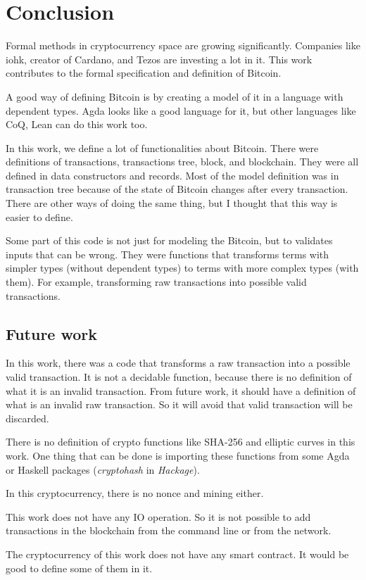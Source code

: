 \section{Conclusion}

Formal methods in cryptocurrency space are growing significantly.
Companies like \gls{iohk}, creator of Cardano, and Tezos are investing a lot in it.
This work contributes to the formal specification and definition of Bitcoin.

A good way of defining Bitcoin is by creating a model of it in a language with dependent types.
Agda looks like a good language for it, but other languages like CoQ, Lean can do this work too.

In this work, we define a lot of functionalities about Bitcoin.
There were definitions of transactions, transactions tree, block, and blockchain.
They were all defined in data constructors and records.
Most of the model definition was in transaction tree
because of the state of Bitcoin changes after every transaction.
There are other ways of doing the same thing,
but I thought that this way is easier to define.

Some part of this code is not just for modeling the Bitcoin,
but to validates inputs that can be wrong.
They were functions that transforms terms with simpler types (without dependent types)
to terms with more complex types (with them).
For example, transforming raw transactions into possible valid transactions.

\subsection{Future work}

In this work, there was a code that transforms a raw transaction into a possible valid transaction.
It is not a decidable function, because there is no definition of what it is an invalid transaction.
From future work, it should have a definition of what is an invalid raw transaction.
So it will avoid that valid transaction will be discarded. 

There is no definition of crypto functions like SHA-256 and elliptic curves in this work.
One thing that can be done is importing these functions from some Agda or Haskell packages
(\emph{cryptohash} in \emph{Hackage}).

In this cryptocurrency, there is no nonce and mining either.

This work does not have any IO operation.
So it is not possible to add transactions in the blockchain from the command line or from the network.

The cryptocurrency of this work does not have any smart contract.
It would be good to define some of them in it.
